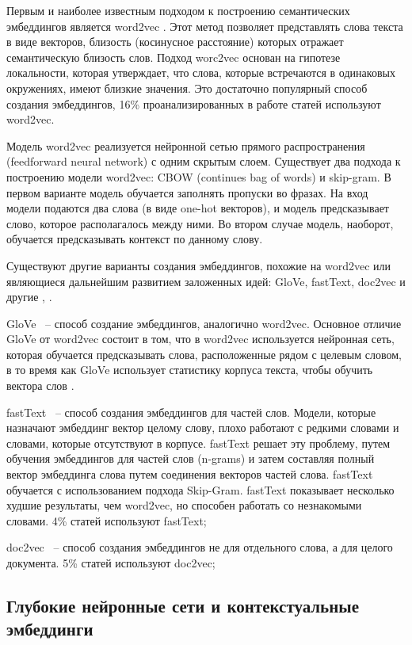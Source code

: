 Первым и наиболее известным подходом к построению семантических эмбеддингов является word2vec \cite{word2vec}. Этот метод позволяет представлять слова текста в виде векторов, близость (косинусное расстояние) которых отражает семантическую близость слов. Подход worc2vec основан на гипотезе локальности, которая утверждает, что слова, которые встречаются в одинаковых окружениях, имеют близкие значения. Это достаточно популярный способ создания эмбеддингов, 16\% проанализированных в работе \cite{no-patterns} статей используют word2vec.

Модель word2vec реализуется нейронной сетью прямого распространения (feedforward neural network) с одним скрытым слоем. Существует два подхода к построению модели word2vec: CBOW (continues bag of words) и skip-gram. В первом варианте модель обучается заполнять пропуски во фразах. На вход модели подаются два слова (в виде one-hot векторов), и модель предсказывает слово, которое располагалось между ними. Во втором случае модель, наоборот, обучается предсказывать контекст по данному слову.

Существуют другие варианты создания эмбеддингов, похожие на word2vec или являющиеся дальнейшим развитием заложенных идей: GloVe, fastText, doc2vec и другие \cite{no-patterns}, \cite{embeddings-habr}.

GloVe ~-- способ создание эмбеддингов, аналогично word2vec. Основное отличие GloVe от word2vec состоит в том, что в word2vec используется нейронная сеть, которая обучается предсказывать слова, расположенные рядом с целевым словом, в то время как GloVe использует статистику корпуса текста, чтобы обучить вектора слов \cite{glove}.

fastText ~-- способ создания эмбеддингов для частей слов. Модели, которые назначают эмбеддинг вектор целому слову, плохо работают с редкими словами  и словами, которые отсутствуют в корпусе. fastText решает эту проблему, путем обучения эмбеддингов для частей слов (n-grams) и затем составляя полный вектор эмбеддинга слова путем соединения векторов частей слова. fastText обучается с использованием подхода Skip-Gram. fastText показывает несколько худшие результаты, чем word2vec, но способен работать со незнакомыми словами. 4\% статей \cite{no-patterns} используют fastText;

doc2vec ~-- способ создания эмбеддингов не для отдельного слова, а для целого документа. 5\% статей \cite{no-patterns} используют doc2vec;

\subsection{Глубокие нейронные сети и контекстуальные эмбеддинги}

